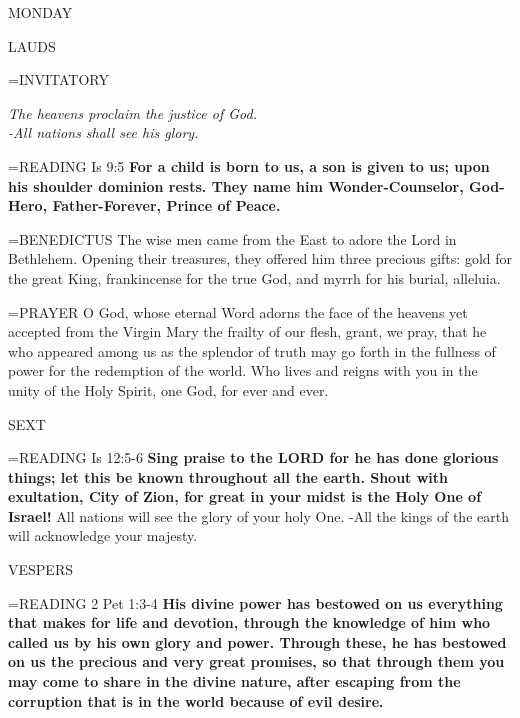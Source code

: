 \begin{center}
\normalsize MONDAY
\end{center}

\begin{flushleft}\normalsize LAUDS\\\end{flushleft}
\hangindent=\parindent \small{INVITATORY}
\begin{center}
\textit{The heavens proclaim the justice of God.\\}
\textit{-All nations shall see his glory.\\}
\end{center}

\hangindent=\parindent \small{READING}    Is 9:5 \textbf{    For a child is born to us, a son is given to us; upon his shoulder dominion rests. They name him Wonder-Counselor, God-Hero, Father-Forever, Prince of Peace.\\}

\hangindent=\parindent \small{BENEDICTUS 	The wise men came from the East to adore the Lord in Bethlehem. Opening their treasures, they offered him three precious gifts: gold for the great King, frankincense for the true God, and myrrh for his burial, alleluia.\\}

\hangindent=\parindent \small{PRAYER 	O God, whose eternal Word adorns the face of the heavens yet accepted from the Virgin Mary the frailty of our flesh, grant, we pray, that he who appeared among us as the splendor of truth may go forth in the fullness of power for the redemption of the world. Who lives and reigns with you in the unity of the Holy Spirit, one God, for ever and ever.}

\begin{flushleft}\normalsize SEXT\\\end{flushleft}
\hangindent=\parindent \small{READING}    Is 12:5-6 \textbf{   Sing praise to the LORD for he has done glorious things; let this be known throughout all the earth. Shout with exultation, City of Zion, for great in your midst is the Holy One of Israel!}
All nations will see the glory of your holy One.
-All the kings of the earth will acknowledge your majesty.

\begin{flushleft}\normalsize VESPERS\\\end{flushleft}
\hangindent=\parindent \small{READING}   2 Pet 1:3-4 \textbf{  His divine power has bestowed on us everything that makes for life and devotion, through the knowledge of him who called us by his own glory and power. Through these, he has bestowed on us the precious and very great promises, so that through them you may come to share in the divine nature, after escaping from the corruption that is in the world because of evil desire.\\}

